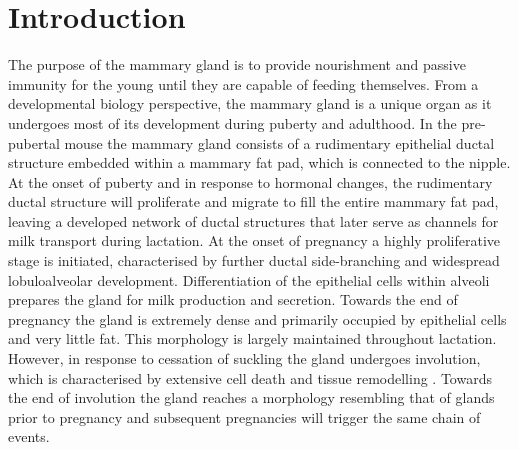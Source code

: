 \documentclass[titlepage, 12pt, oneside]{amsart}
\begin{document}
\section{Introduction}

The purpose of the mammary gland is to provide nourishment and passive immunity for the young until they are capable of feeding themselves.
From a developmental biology perspective, the mammary gland is a unique organ as it undergoes most of its development during puberty and adulthood\autocite{Watson2008,Hennighausen2005,Hennighausen1998,Inman2015}.
In the pre-pubertal mouse the mammary gland consists of a rudimentary epithelial ductal structure embedded within a mammary fat pad, which is connected to the nipple\autocite{Mikkola2006,Hens2005}.
At the onset of puberty and in response to hormonal changes, the rudimentary ductal structure will proliferate and migrate to fill the entire mammary fat pad, leaving a developed network of ductal structures that later serve as channels for milk transport during lactation.
At the onset of pregnancy a highly proliferative stage is initiated, characterised by further ductal side-branching and widespread lobuloalveolar development\autocite{Watson2008}.
Differentiation of the epithelial cells within alveoli prepares the gland for milk production and secretion.
Towards the end of pregnancy the gland is extremely dense and primarily occupied by epithelial cells and very little fat.
This morphology is largely maintained throughout lactation.
However, in response to cessation of suckling the gland undergoes involution, which is characterised by extensive cell death and tissue remodelling \autocite{Inman2015,Watson2006}.
Towards the end of involution the gland reaches a morphology resembling that of glands prior to pregnancy and subsequent pregnancies will trigger the same chain of events.
\end{document}
